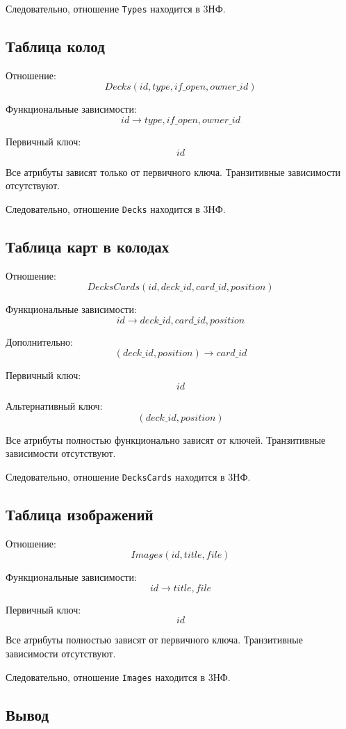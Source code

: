 Следовательно, отношение \texttt{Types} находится в 3НФ.

\subsection{Таблица колод}

Отношение:
\[
Decks(
id,
type,
if\_open,
owner\_id
)
\]

Функциональные зависимости:
\[
id \rightarrow type,
if\_open,
owner\_id
\]

Первичный ключ:
\[
id
\]

Все атрибуты зависят только от первичного ключа.
Транзитивные зависимости отсутствуют.

Следовательно, отношение \texttt{Decks} находится в 3НФ.

\subsection{Таблица карт в колодах}

Отношение:
\[
DecksCards(
id,
deck\_id,
card\_id,
position
)
\]

Функциональные зависимости:
\[
id \rightarrow deck\_id,
card\_id,
position
\]

Дополнительно:
\[
(deck\_id, position) \rightarrow card\_id
\]

Первичный ключ:
\[
id
\]

Альтернативный ключ:
\[
(deck\_id, position)
\]

Все атрибуты полностью функционально зависят от ключей.
Транзитивные зависимости отсутствуют.

Следовательно, отношение \texttt{DecksCards} находится в 3НФ.

\subsection{Таблица изображений}

Отношение:
\[
Images(
id,
title,
file
)
\]

Функциональные зависимости:
\[
id \rightarrow title,
file
\]

Первичный ключ:
\[
id
\]

Все атрибуты полностью зависят от первичного ключа.
Транзитивные зависимости отсутствуют.

Следовательно, отношение \texttt{Images} находится в 3НФ.

\subsection{Вывод}

